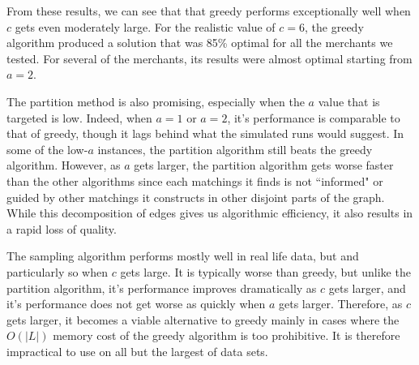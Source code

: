 From these results, we can see that that greedy performs exceptionally well when $c$ gets even moderately large.
For the realistic value of $c=6$, the greedy algorithm produced a solution that was 85\% optimal for all the
merchants we tested. For several of the merchants, its results were almost optimal starting from $a=2$. \vs

The partition method is also promising, especially when the $a$ value that is targeted is low. Indeed, when $a=1$ or $a=2$,
it's performance is comparable to that of greedy, though it lags behind what the simulated runs would suggest.
In some of the low-$a$ instances, the partition algorithm still beats the greedy algorithm. However, as $a$ gets larger,
the partition algorithm gets worse faster than the other algorithms since each matchings it finds is not ``informed" or guided by other matchings it constructs in other disjoint parts of the graph. While this decomposition of edges gives us algorithmic efficiency, it also results in a rapid loss of quality. \vs

The sampling algorithm performs mostly well in real life data, but and particularly so when $c$ gets large. It is typically worse than greedy, but unlike the partition algorithm, it's performance improves dramatically as $c$ gets larger, and it's performance does not get worse as quickly when $a$ gets larger. Therefore, as $c$ gets larger, it becomes a viable alternative to greedy mainly in cases where the $O(|L|)$ memory cost of the greedy algorithm is too prohibitive. It is therefore impractical to use on all but the largest of data sets. 
